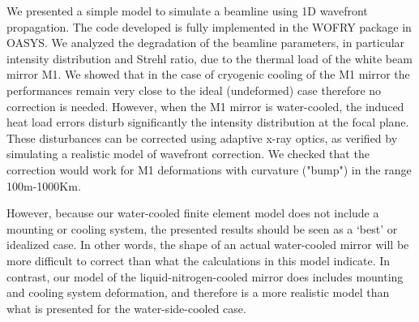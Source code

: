 \documentclass[]{spie}  %
\begin{document}
We presented a simple model to simulate a beamline using 1D wavefront propagation. The code developed is fully implemented in the WOFRY package in OASYS.
We analyzed the degradation of the beamline parameters, in particular intensity distribution and Strehl ratio, due to the thermal load of the white beam mirror M1. We showed that in the case of cryogenic cooling of the M1 mirror the performances remain very close to the ideal (undeformed) case therefore no correction is needed. However, when the M1 mirror is water-cooled, the induced heat load errors disturb significantly the intensity distribution at the focal plane. These disturbances can be corrected using adaptive x-ray optics, as verified by simulating a realistic model of wavefront correction. We checked that the correction would work for M1 deformations with curvature ("bump") in the range 100m-1000Km. 

However, because our water-cooled finite element model does not include a mounting or cooling system, the presented results should be seen as a `best' or idealized case.  In other words, the shape of an actual water-cooled mirror will be more difficult to correct than what the calculations in this model indicate. In contrast, our model of the liquid-nitrogen-cooled mirror does includes mounting and cooling system deformation, and therefore is a more realistic model than what is presented for the water-side-cooled case.


   
\end{document}
